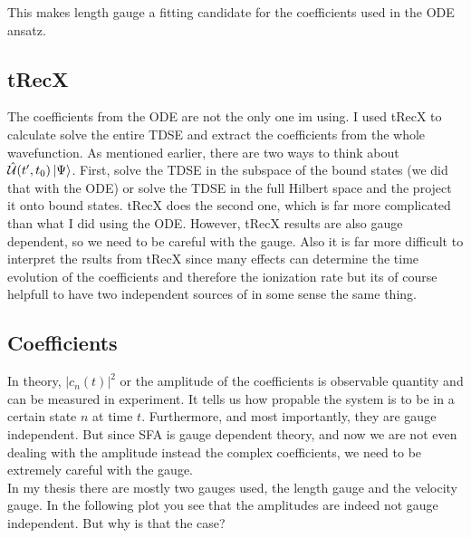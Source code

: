 This makes length gauge a fitting candidate for the coefficients used in the ODE ansatz.




\subsection{tRecX}






The coefficients from the ODE are not the only one im using. I used tRecX to calculate solve the entire TDSE and extract the coefficients from the whole wavefunction.
As mentioned earlier, there are two ways to think about $\hat{\mathcal{U}}(t',t_0)\ket{\Psi}$. 
First, solve the TDSE in the subspace of the bound states (we did that with the ODE) or solve the TDSE in the full Hilbert space and the project it onto bound states. 
tRecX does the second one, which is far more complicated than what I did using the ODE.
However, tRecX results are also gauge dependent, so we need to be careful with the gauge.
Also it is far more difficult to interpret the rsults from tRecX since many effects can determine the time evolution of the coefficients and therefore the ionization rate but its of course helpfull to have two independent sources of in some sense the same thing.







\subsection{Coefficients}
In theory, $|c_n(t)|^2$ or the amplitude of the coefficients is observable quantity and can be measured in experiment.
It tells us how propable the system is to be in a certain state $n$ at time $t$.
Furthermore, and most importantly, they are gauge independent.
But since SFA is gauge dependent theory, and now we are not even dealing with the amplitude instead the complex coefficients, we need to be extremely careful with the gauge.\\
In my thesis there are mostly two gauges used, the length gauge and the velocity gauge. 
In the following plot you see that the amplitudes are indeed not gauge independent. But why is that the case?\\\\

